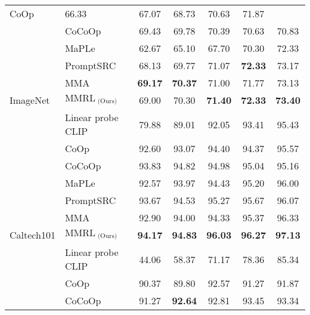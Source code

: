 \begin{table*}[t]
{{\begin{tabular}{@{}ll|ccccc}
      CoOp &
      66.33 &
      67.07 &
      68.73 &
      70.63 &
      71.87 \\
     &
      CoCoOp &
      69.43 &
      69.78 &
      70.39 &
      70.63 &
      70.83 \\
     &
      MaPLe &
      62.67 &
      65.10 &
      67.70 &
      70.30 &
      72.33 \\
     &
      PromptSRC &
      68.13 &
      69.77 &
      71.07 &
      \textbf{72.33} &
      73.17 \\
     &
      MMA &
      \textbf{69.17} &
      \textbf{70.37} &
      71.00 &
      71.77 &
      73.13 \\
    \multirow{-7}{*}{ImageNet} &
      \cellcolor[HTML]{E8E8E8}$\text{MMRL}_{\text{ (Ours)}}$ &
      \cellcolor[HTML]{E8E8E8}69.00 &
      \cellcolor[HTML]{E8E8E8}70.30 &
      \cellcolor[HTML]{E8E8E8}\textbf{71.40} &
      \cellcolor[HTML]{E8E8E8}\textbf{72.33} &
      \cellcolor[HTML]{E8E8E8}\textbf{73.40} \\ \midrule
     &
      Linear probe CLIP &
      79.88 &
      89.01 &
      92.05 &
      93.41 &
      95.43 \\
     &
      CoOp &
      92.60 &
      93.07 &
      94.40 &
      94.37 &
      95.57 \\
     &
      CoCoOp &
      93.83 &
      94.82 &
      94.98 &
      95.04 &
      95.16 \\
     &
      MaPLe &
      92.57 &
      93.97 &
      94.43 &
      95.20 &
      96.00 \\
     &
      PromptSRC &
      93.67 &
      94.53 &
      95.27 &
      95.67 &
      96.07 \\
     &
      MMA &
      92.90 &
      94.00 &
      94.33 &
      95.37 &
      96.33 \\
    \multirow{-7}{*}{Caltech101} &
      \cellcolor[HTML]{E8E8E8}$\text{MMRL}_{\text{ (Ours)}}$ &
      \cellcolor[HTML]{E8E8E8}\textbf{94.17} &
      \cellcolor[HTML]{E8E8E8}\textbf{94.83} &
      \cellcolor[HTML]{E8E8E8}\textbf{96.03} &
      \cellcolor[HTML]{E8E8E8}\textbf{96.27} &
      \cellcolor[HTML]{E8E8E8}\textbf{97.13} \\ \midrule
     &
      Linear probe CLIP &
      44.06 &
      58.37 &
      71.17 &
      78.36 &
      85.34 \\
     &
      CoOp &
      90.37 &
      89.80 &
      92.57 &
      91.27 &
      91.87 \\
     &
      CoCoOp &
      91.27 &
      \textbf{92.64} &
      92.81 &
      93.45 &
      93.34 \\

\end{tabular}}}
\end{table*}
